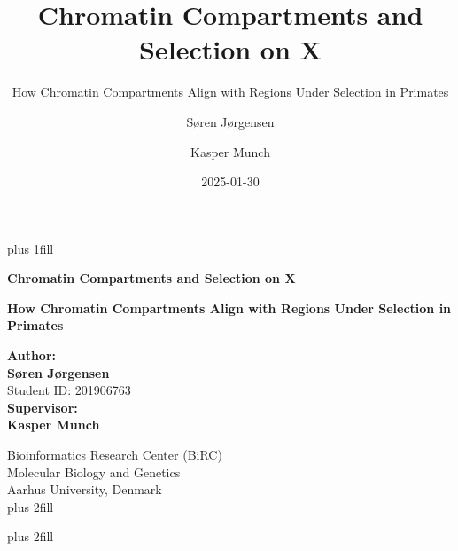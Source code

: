 \documentclass[
  11pt,
  a4paper,
]{scrbook}
\title{Chromatin Compartments and Selection on X}
\subtitle{How Chromatin Compartments Align with Regions Under Selection
in Primates}
\author{Søren Jørgensen \and Kasper Munch}
\date{2025-01-30}
\begin{document}
\frontmatter
\cleardoublepage
\thispagestyle{empty}
{\centering
\hbox{}\vskip 0cm plus 1fill

{%
\Huge\bfseries Chromatin Compartments and Selection on X \par}
\vspace{3ex}
{\Large\bfseries How Chromatin Compartments Align with Regions Under
Selection in Primates \par}
\vspace{5ex}

        {\bfseries Author: \\ \vspace{0.5ex}}
        {\bfseries\Large Søren Jørgensen \\ \vspace{0.7ex}}
            {\large Student ID: 201906763 \\ \vspace{1.2ex} }
        {\bfseries Supervisor: \\ \vspace{0.5ex}}
        {\bfseries\Large Kasper Munch \\ \vspace{0.7ex}}
        \par \vspace{0.7ex}
        {\large Bioinformatics Research Center (BiRC) \\ \vspace{0.7ex}}
        {\large Molecular Biology and Genetics \\ \vspace{0.7ex}}
        {\large Aarhus University, Denmark \\ \vspace{2ex}}
%
\vskip 0cm plus 2fill

{ \par}
\vskip 0cm plus 2fill

}
\end{document}
